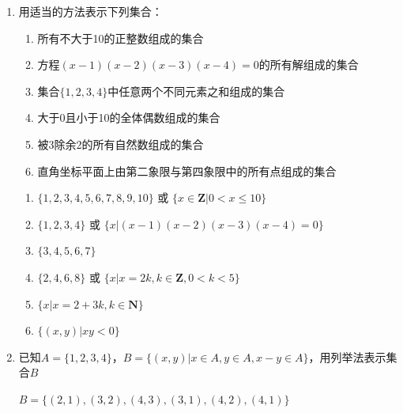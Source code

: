 \begin{enumerate}
        $0  \blkda{$\notin$}  \{x | x^2 + 1 = 0\},   2   \blkda{$\in$}    \{x | x \geq \sqrt[3]{3}\},  (0, 0) \blkda{$\notin$}    \{(x,y) | 2x + 3y + 1 \leq 0\}$
    \item 用适当的方法表示下列集合：
        \begin{enumerate}
            \item 所有不大于10的正整数组成的集合
            \item 方程$(x-1)(x-2)(x-3)(x-4)=0$的所有解组成的集合
            \item 集合$\{1,2,3,4\}$中任意两个不同元素之和组成的集合
            \item 大于0且小于10的全体偶数组成的集合
            \item 被3除余2的所有自然数组成的集合
            \item 直角坐标平面上由第二象限与第四象限中的所有点组成的集合
        \end{enumerate}
        \begin{jieda}
            \begin{enumerate}
                \item $\{1,2,3,4,5,6,7,8,9,10\}$ 或 $\{x \in \mathbf{Z} | 0 < x \leq 10 \}$
                \item $\{1,2,3,4\}$ 或 $\{x | (x-1)(x-2)(x-3)(x-4)=0 \}$
                \item $\{3,4,5,6,7\}$ 
                \item $\{2,4,6,8\}$ 或 $\{x | x = 2k, k \in \mathbf{Z}, 0 < k < 5\}$
                \item $\{x | x = 2+3k, k \in \mathbf{N} \}$
                \item $\{(x, y) | xy < 0\}$
            \end{enumerate}
        \end{jieda}
    \item 已知$A = \{1,2,3,4\}$，$B = \{(x,y)|x \in A, y \in A, x - y \in A\}$，用列举法表示集合$B$
    \begin{jieda}
        $B = \{(2,1), (3,2), (4,3), (3,1), (4,2), (4,1)\}$
    \end{jieda}
    \end{enumerate}
